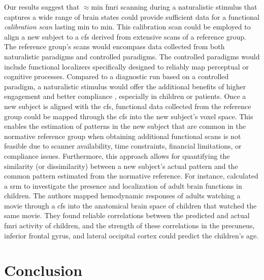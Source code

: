 %
Our results suggest that $\approx$\unit[15]{min} \ac{fmri} scanning during a
naturalistic stimulus that captures a wide range of brain states could provide
sufficient data for a functional \textit{calibration scan} lasting
\unit[15]{min} to \unit[30]{min}.
%
This calibration scan could be employed to align a new subject to a \ac{cfs}
derived from extensive scans of a reference group.
%
The reference group's scans would encompass data collected from both
naturalistic paradigms and controlled paradigms.
%
The controlled paradigms would include functional localizers specifically
designed to reliably map perceptual or cognitive processes.
%
Compared to a diagnostic run based on a controlled paradigm, a naturalistic
stimulus would offer the additional benefits of higher engagement and better
compliance \citep{vanderwal2015inscapes, eickhoff2020towards}, especially in
children or patients.
%
Once a new subject is aligned with the \ac{cfs}, functional data collected from
the reference group could be mapped through the \ac{cfs} into the new subject's
voxel space.
%
This enables the estimation of patterns in the new subject that are common in
the normative reference group when obtaining additional functional scans is not
feasible due to scanner availability, time constraints, financial limitations,
or compliance issues.
%
Furthermore, this approach allows for quantifying the similarity (or
dissimilarity) between a new subject's actual pattern and the common pattern
estimated from the normative reference.
%
For instance, \citet{yates2021emergence} calculated a \ac{srm} to investigate
the presence and localization of adult brain functions in children.
%
The authors mapped hemodynamic responses of adults watching a movie through a
\ac{cfs} into the anatomical brain space of children that watched the same
movie.
%
They found reliable correlations between the predicted and actual \ac{fmri}
activity of children, and the strength of these correlations in the precuneus,
inferior frontal gyrus, and lateral occipital cortex could predict the
children's age.



\section{Conclusion}


\footnotesize

